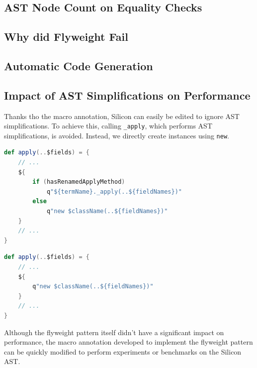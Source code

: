 \documentclass[11pt]{article}
\begin{document}
    \subsection{AST Node Count on Equality Checks}

    \subsection{Why did Flyweight Fail}

    \subsection{Automatic Code Generation}

    \subsection{Impact of AST Simplifications on Performance}

    Thanks tho the macro annotation, Silicon can easily be edited to ignore
    AST simplifications. To achieve this, calling \texttt{\_apply}, which performs AST
    simplifications, is avoided. Instead, we directly create instances using \texttt{new}.

    \begin{lstlisting}[language=Scala, caption=Use AST simplifications.]
def apply(..$fields) = {
    // ...
    ${
        if (hasRenamedApplyMethod)
            q"${termName}._apply(..${fieldNames})"
        else
            q"new $className(..${fieldNames})"
    }
    // ...
}  
    \end{lstlisting}

    \begin{lstlisting}[language=Scala, caption=Ignore AST simplifications.]
def apply(..$fields) = {
    // ...
    ${
        q"new $className(..${fieldNames})"
    }
    // ...
}  
    \end{lstlisting}

    Although the flyweight pattern itself didn't have a significant impact on performance,
    the macro annotation developed to implement the flyweight pattern can
    be quickly modified to perform experiments or benchmarks on the Silicon AST.

    \printbibliography
    
\end{document}
